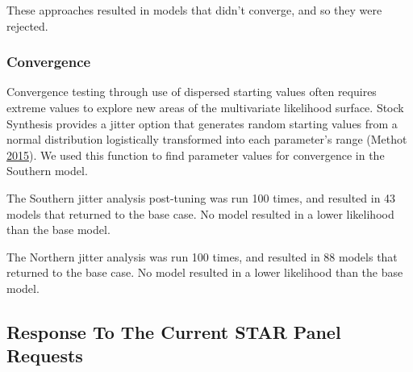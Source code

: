 \documentclass[12pt,]{article}
\begin{document}
These approaches resulted in models that didn't converge, and so they
were rejected.

\subsubsection{Convergence}\label{convergence}

Convergence testing through use of dispersed starting values often
requires extreme values to explore new areas of the multivariate
likelihood surface. Stock Synthesis provides a jitter option that
generates random starting values from a normal distribution logistically
transformed into each parameter's range (Methot
\protect\hyperlink{ref-Methot2015}{2015}). We used this function to find
parameter values for convergence in the Southern model.

The Southern jitter analysis post-tuning was run 100 times, and resulted
in 43 models that returned to the base case. No model resulted in a
lower likelihood than the base model.

The Northern jitter analysis was run 100 times, and resulted in 88
models that returned to the base case. No model resulted in a lower
likelihood than the base model.

\clearpage

\subsection{Response To The Current STAR Panel
Requests}\label{response-to-the-current-star-panel-requests}
\end{document}
